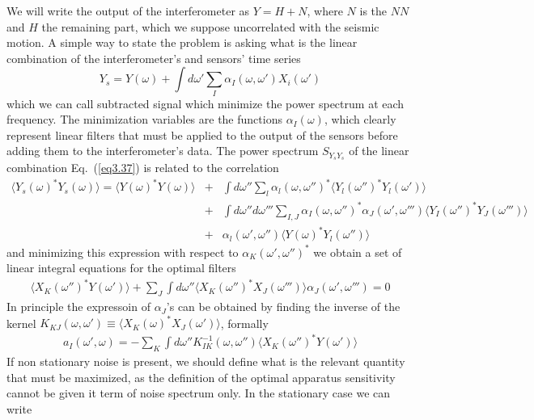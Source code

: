We will write the output of the interferometer as $Y = H + N$, where $N$ is the $NN$ and $H$ the remaining part, which we suppose uncorrelated with the seismic motion. A simple way to state the problem is asking what is the linear combination of the interferometer's and sensors' time series 
\begin{equation}
	Y_{s}=Y(\omega)+\int d\omega '\sum_{I}\alpha_{I}(\omega,\omega ')X_{i}(\omega')
	\label{eq3.45}
\end{equation}
which we can call subtracted signal which minimize the power spectrum at each frequency. The minimization variables are the functions $\alpha_{I}(\omega)$, which clearly represent linear filters that must be applied to the output of the sensors before adding them to the interferometer's data. The power spectrum $S_{Y_{s}Y_{s}}$ of the linear combination Eq.~(\ref{eq3.37}) is related to the correlation
\begin{eqnarray}
		\langle{Y_{s}(\omega)^{*}Y_{s}(\omega)}\rangle=\langle{Y(\omega)^{*}Y(\omega)}\rangle&+&\int d\omega '' \sum_{l}\alpha_{l}(\omega,\omega '')^{*}\langle{Y_{l}(\omega '')^{*}Y_{l}(\omega ')}\rangle\nonumber\\
		&+&\int d\omega ''d\omega ''' \sum_{I,J}\alpha_{I}(\omega,\omega '')^{*}\alpha_{J}(\omega ',\omega ''')\langle{Y_{I}(\omega '')^{*}Y_{J}(\omega ''')}\rangle\nonumber\\
		&+&\alpha_{l}(\omega ',\omega '')\langle{Y(\omega)^{*}Y_{l}(\omega '')}\rangle
		\label{eq3.46}
\end{eqnarray}
and minimizing this expression with respect to $\alpha_{K}(\omega ',\omega '')^{*}$ we obtain a set of linear integral equations for the optimal filters
\begin{eqnarray}
			\langle X_{K}(\omega '')^{*}Y(\omega ') \rangle+\sum_{J}\int d\omega ''\langle X_{K}(\omega '')^{*}X_{J}(\omega ''') \rangle\alpha_{J}(\omega ',\omega ''')=0
	\label{eq3.47}
\end{eqnarray}
In principle the expressoin of $\alpha_{J}$'s can be obtained by finding the inverse of the kernel $K_{KJ}(\omega,\omega')\equiv\langle X_{K}(\omega)^{*}X_{J}(\omega')\rangle$, formally
\begin{eqnarray}
		a_{I}(\omega',\omega)=-\sum_{K}\int d\omega'' K^{-1}_{IK}(\omega,\omega'')\langle X_{K}(\omega'')^{*}Y(\omega')\rangle
		\label{eq3.48}
\end{eqnarray}
If non stationary noise is present, we should define what is the relevant quantity that must be maximized, as the definition of the optimal apparatus sensitivity cannot be given it term of noise spectrum only. In the stationary case we can write
